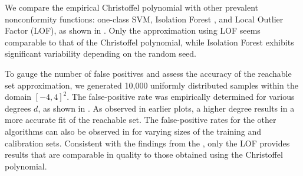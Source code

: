 \documentclass[pmlr]{jmlr}%
\begin{document}
We compare the empirical Christoffel polynomial with other prevalent nonconformity functions: one-class SVM, Isolation Forest \citep{isolation}, and Local Outlier Factor (LOF), as shown in . 
Only the approximation using LOF seems comparable to that of the Christoffel polynomial, while Isolation Forest exhibits significant variability depending on the random seed.

To gauge the number of false positives and assess the accuracy of the reachable set approximation, we generated 10,000 uniformly distributed samples within the domain $[-4, 4]^2$. The false-positive rate was empirically determined for various degrees $d$, as shown in . As observed in earlier plots, a higher degree results in a more accurate fit of the reachable set. The false-positive rates for the other algorithms can also be observed in  for varying sizes of the training and calibration sets. Consistent with the findings from the , only the LOF provides results that are comparable in quality to those obtained using the Christoffel polynomial.
\end{document}
